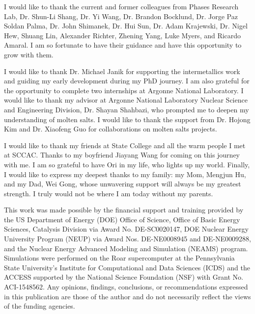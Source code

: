 \documentclass[letterpaper, 12pt]{report}
\begin{document}
I would like to thank the current and former colleagues from Phases Research Lab, Dr. Shun-Li Shang, Dr. Yi Wang, Dr. Brandon Bocklund, Dr. Jorge Paz Soldan Palma, Dr. John Shimanek, Dr. Hui Sun, Dr. Adam Krajewski, Dr. Nigel Hew, Shuang Lin, Alexander Richter, Zhening Yang, Luke Myers, and Ricardo Amaral. I am so fortunate to have their guidance and have this opportunity to grow with them.

I would like to thank Dr. Michael Janik for supporting the intermetallics work and guiding my early development during my PhD journey. I am also grateful for the opportunity to complete two internships at Argonne National Laboratory. I would like to thank my advisor at Argonne National Laboratory Nuclear Science and Engineering Division, Dr. Shayan Shahbazi, who prompted me to deepen my understanding of molten salts. I would like to thank the support from Dr. Hojong Kim and Dr. Xiaofeng Guo for collaborations on molten salts projects.

I would like to thank my friends at State College and all the warm people I met at SCCAC. Thanks to my boyfriend Jiayang Wang for coming on this journey with me. I am so grateful to have Ori in my life, who lights up my world. Finally, I would like to express my deepest thanks to my family: my Mom, Mengjun Hu, and my Dad, Wei Gong, whose unwavering support will always be my greatest strength. I truly would not be where I am today without my parents.

This work was made possible by the financial support and training provided by the US Department of Energy (DOE) Office of Science, Office of Basic Energy Sciences, Catalysis Division via Award No. DE-SC0020147, DOE Nuclear Energy University Program (NEUP) via Award Nos. DE-NE0008945 and DE-NE0009288, and the Nuclear Energy Advanced Modeling and Simulation (NEAMS) program. Simulations were performed on the Roar supercomputer at the Pennsylvania State University's Institute for Computational and Data Sciences (ICDS) and the ACCESS supported by the National Science Foundation (NSF) with Grant No. ACI-1548562. Any opinions, findings, conclusions, or recommendations expressed in this publication are those of the author and do not necessarily reflect the views of the funding agencies.


\newpage
\setlength\parindent{2em} %


\end{document}
